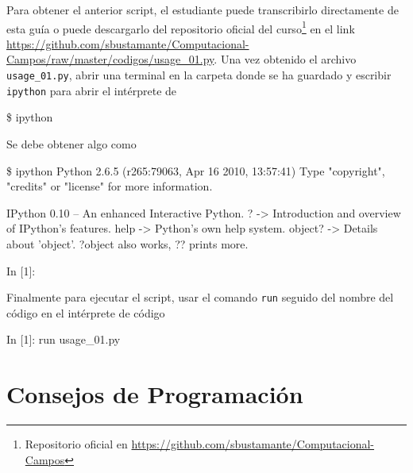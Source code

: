 Para obtener el anterior script, el estudiante puede transcribirlo 
directamente de esta guía o puede descargarlo del repositorio oficial del 
curso\footnote{Repositorio oficial en 
\url{https://github.com/sbustamante/Computacional-Campos}} en el link
\url{https://github.com/sbustamante/Computacional-Campos/raw/master/codigos/usage\_01.py}.
Una vez obtenido el archivo \texttt{usage\_01.py}, abrir una terminal en la 
carpeta donde se ha guardado y escribir \texttt{ipython} para abrir el 
intérprete de \python


\begin{listing}[style=consola, numbers=none]
\$ ipython
\end{listing}


Se debe obtener algo como


\begin{listing}[style=consola, numbers=none]
\$ ipython
Python 2.6.5 (r265:79063, Apr 16 2010, 13:57:41) 
Type "copyright", "credits" or "license" for more information.

IPython 0.10 -- An enhanced Interactive Python.
?         -> Introduction and overview of IPython's features.
help      -> Python's own help system.
object?   -> Details about 'object'. ?object also works, ?? prints more.

In [1]: 
\end{listing}


Finalmente para ejecutar el script, usar el comando \texttt{run} seguido
del nombre del código en el intérprete de código \python


\begin{listing}[style=consola, numbers=none]
In [1]: run usage_01.py
\end{listing}





\section{Consejos de Programación}
\label{sec:advice}


